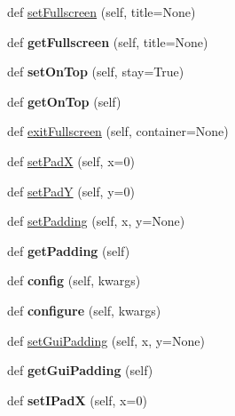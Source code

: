 \begin{DoxyCompactItemize}
def \hyperlink{classappjar_1_1gui_ab87484f1715bcc51ad4e9d1235554c6b}{set\+Fullscreen} (self, title=None)
\item 
\mbox{\label{classappjar_1_1gui_a248c1f260eb52e0e135e403442301dd7}} 
def {\bfseries get\+Fullscreen} (self, title=None)
\item 
\mbox{\label{classappjar_1_1gui_a331c6f58b8292a3aa5b83a5389bb4407}} 
def {\bfseries set\+On\+Top} (self, stay=True)
\item 
\mbox{\label{classappjar_1_1gui_a91af978fd6edd7115d66d743b1a2155d}} 
def {\bfseries get\+On\+Top} (self)
\item 
def \hyperlink{classappjar_1_1gui_a12568d9c85a65c4e0cf77f1f1f3c6acc}{exit\+Fullscreen} (self, container=None)
\item 
def \hyperlink{classappjar_1_1gui_ad35b686450ff4316f6b4f8a36739e7b2}{set\+PadX} (self, x=0)
\item 
def \hyperlink{classappjar_1_1gui_adf56e64b098d2f072711b2ad12901b38}{set\+PadY} (self, y=0)
\item 
def \hyperlink{classappjar_1_1gui_a986ce814d62f922393612466c04a7236}{set\+Padding} (self, x, y=None)
\item 
\mbox{\label{classappjar_1_1gui_af969c3a265e27295a554f7a27fa43023}} 
def {\bfseries get\+Padding} (self)
\item 
\mbox{\label{classappjar_1_1gui_a63fd0bb4eccc47f4b2c9e79ca9d0c2f7}} 
def {\bfseries config} (self, kwargs)
\item 
\mbox{\label{classappjar_1_1gui_a39793680d9880e3dea6fdff0902969e3}} 
def {\bfseries configure} (self, kwargs)
\item 
def \hyperlink{classappjar_1_1gui_aa421d6c507945907169e871f36489fe4}{set\+Gui\+Padding} (self, x, y=None)
\item 
\mbox{\label{classappjar_1_1gui_a7051428db462ba6ebcfcfcaa1ed24f46}} 
def {\bfseries get\+Gui\+Padding} (self)
\item 
\mbox{\label{classappjar_1_1gui_a4cffdc90f8ed0b44dc09ce055e9521c7}} 
def {\bfseries set\+I\+PadX} (self, x=0)

\end{DoxyCompactItemize}
